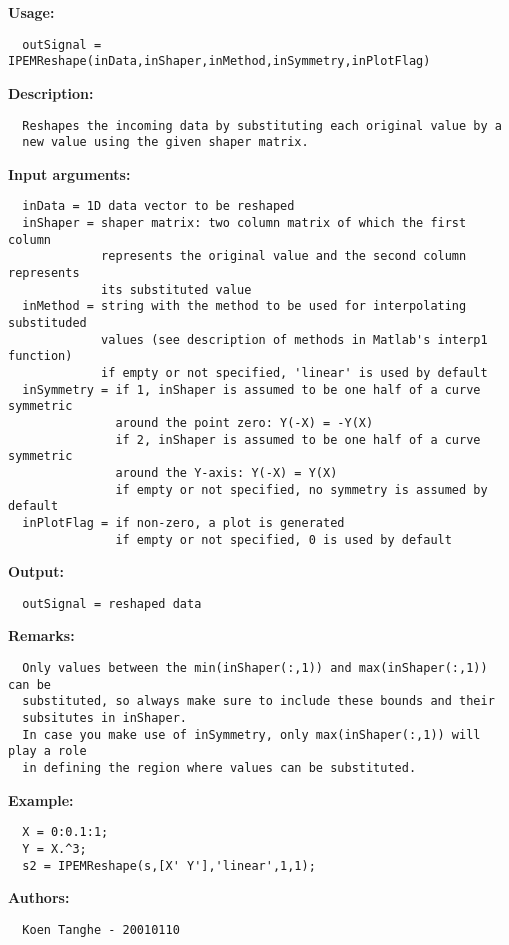 \textbf{Usage:}
\begin{verbatim}  outSignal = IPEMReshape(inData,inShaper,inMethod,inSymmetry,inPlotFlag)

\end{verbatim}
\textbf{Description:}
\begin{verbatim}  Reshapes the incoming data by substituting each original value by a 
  new value using the given shaper matrix.

\end{verbatim}
\textbf{Input arguments:}
\begin{verbatim}  inData = 1D data vector to be reshaped
  inShaper = shaper matrix: two column matrix of which the first column
             represents the original value and the second column represents
             its substituted value
  inMethod = string with the method to be used for interpolating substituded
             values (see description of methods in Matlab's interp1 function)
             if empty or not specified, 'linear' is used by default
  inSymmetry = if 1, inShaper is assumed to be one half of a curve symmetric
               around the point zero: Y(-X) = -Y(X)
               if 2, inShaper is assumed to be one half of a curve symmetric
               around the Y-axis: Y(-X) = Y(X)
               if empty or not specified, no symmetry is assumed by default
  inPlotFlag = if non-zero, a plot is generated
               if empty or not specified, 0 is used by default

\end{verbatim}
\textbf{Output:}
\begin{verbatim}  outSignal = reshaped data

\end{verbatim}
\textbf{Remarks:}
\begin{verbatim}  Only values between the min(inShaper(:,1)) and max(inShaper(:,1)) can be
  substituted, so always make sure to include these bounds and their
  subsitutes in inShaper. 
  In case you make use of inSymmetry, only max(inShaper(:,1)) will play a role
  in defining the region where values can be substituted.

\end{verbatim}
\textbf{Example:}
\begin{verbatim}  X = 0:0.1:1;
  Y = X.^3;
  s2 = IPEMReshape(s,[X' Y'],'linear',1,1);

\end{verbatim}
\textbf{Authors:}
\begin{verbatim}  Koen Tanghe - 20010110
\end{verbatim}


